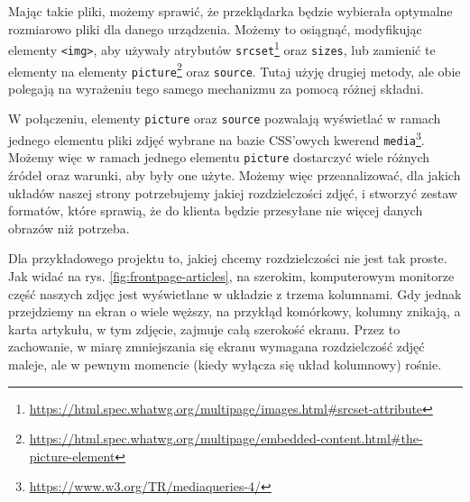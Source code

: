 \documentclass[licencjacka]{pracadypl}
\begin{document}
Mając takie pliki, możemy sprawić, że przeklądarka będzie wybierała optymalne rozmiarowo pliki dla danego urządzenia. Możemy to osiągnąć, modyfikując elementy \texttt{<img>}, aby używały atrybutów \texttt{srcset}\footnote{\url{https://html.spec.whatwg.org/multipage/images.html\#srcset-attribute}} oraz \texttt{sizes}, lub zamienić te elementy na elementy \texttt{picture}\footnote{\url{https://html.spec.whatwg.org/multipage/embedded-content.html\#the-picture-element}} oraz \texttt{source}. Tutaj użyję drugiej metody, ale obie polegają na wyrażeniu tego samego mechanizmu za pomocą różnej składni.

W połączeniu, elementy \texttt{picture} oraz \texttt{source} pozwalają wyświetlać w ramach jednego elementu pliki zdjęć wybrane na bazie CSS'owych kwerend \texttt{media}\footnote{\url{https://www.w3.org/TR/mediaqueries-4/}}. Możemy więc w ramach jednego elementu \texttt{picture} dostarczyć wiele różnych źródeł oraz warunki, aby były one użyte. Możemy więc przeanalizować, dla jakich układów naszej strony potrzebujemy jakiej rozdzielczości zdjęć, i stworzyć zestaw formatów, które sprawią, że do klienta będzie przesyłane nie więcej danych obrazów niż potrzeba.

Dla przykładowego projektu to, jakiej chcemy rozdzielczości nie jest tak proste. Jak widać na rys. \ref{fig:frontpage-articles}, na szerokim, komputerowym monitorze część naszych zdjęc jest wyświetlane w układzie z trzema kolumnami. Gdy jednak przejdziemy na ekran o wiele węższy, na przykłąd komórkowy, kolumny znikają, a karta artykułu, w tym zdjęcie, zajmuje całą szerokość ekranu. Przez to zachowanie, w miarę zmniejszania się ekranu wymagana rozdzielczość zdjęć maleje, ale w pewnym momencie (kiedy wyłącza się układ kolumnowy) rośnie.
\end{document}

